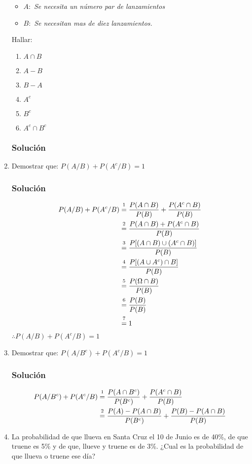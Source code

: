 \begin{enumerate}
\begin{itemize}
\item $A:$ \textit{Se necesita un número par de lanzamientos}
\item $B:$ \textit{Se necesitan mas de diez lanzamientos.}
\end{itemize}
Hallar:
\begin{enumerate}
\item $A\cap B$
\item $A-B$
\item $B-A$
\item $A^c$
\item $B^c$
\item $A^c \cap B^c$
\end{enumerate}
\subsubsection{Solución}
\item Demostrar que: $P(A/B)+P(A^c/B)=1$
\subsubsection{Solución}
\begin{align*}
P(A/B)+P(A^c/B) &\varstackrel{1}{=} \dfrac{P(A\cap B)}{P(B)} + \dfrac{P(A^c\cap B)}{P(B)} \\
  &\varstackrel{2}{=} \dfrac{P(A\cap B)+P(A^c\cap B)}{P(B)} \\
    &\varstackrel{3}{=} \dfrac{P[(A\cap B)\cup(A^c\cap B)]}{P(B)} \\
      &\varstackrel{4}{=} \dfrac{P[(A\cup A^c)\cap B]}{P(B)} \\
        &\varstackrel{5}{=} \dfrac{P(\Omega\cap B)}{P(B)} \\
           &\varstackrel{6}{=} \dfrac{P(B)}{P(B)} \\
                 &\varstackrel{7}{=} 1 \\
\end{align*}
$\therefore P(A/B)+P(A^c/B)=1$
\item Demostrar que: $P(A/B^c)+P(A^c/B)=1$
\subsubsection{Solución}
\begin{align*}
P(A/B^c)+P(A^c/B) &\varstackrel{1}{=} \dfrac{P(A\cap B^c)}{P(B^c)} + \dfrac{P(A^c\cap B)}{P(B)} \\
&\varstackrel{2}{=} \dfrac{P(A)-P(A\cap B)}{P(B^c)}+ \dfrac{P(B)-P(A\cap B)}{P(B)}
\end{align*}
\item La probabilidad de que llueva en Santa Cruz el 10 de Junio es de 40\%, de que truene es 5\% y de que, llueve y truene es de 3\%. ¿Cual es la probabilidad de que llueva o truene ese día?

\end{enumerate}
